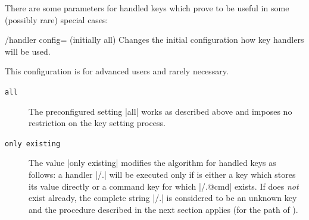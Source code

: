 There are some parameters for handled keys which prove to be useful in some
(possibly rare) special cases:
%
\begin{key}{/handler config= (initially all)}
    Changes the initial configuration how key handlers will be used.

    This configuration is for advanced users and rarely necessary.
    \begin{description}
        \item[\texttt{all}] The preconfigured setting |all| works as described
            above and imposes no restriction on the key setting process.
        \item[\texttt{only existing}] The value |only existing| modifies the
            algorithm for handled keys as follows: a handler |/.| will be executed only if  is
            either a key which stores its value directly or a command key for
            which |/.@cmd| exists. If  does \emph{not} exist
            already, the complete string |/.| is
            considered to be an unknown key and the procedure described in the
            next section applies (for the path of ).
\begin{codeexample}[]





\end{codeexample}
\end{description}
\end{key}
